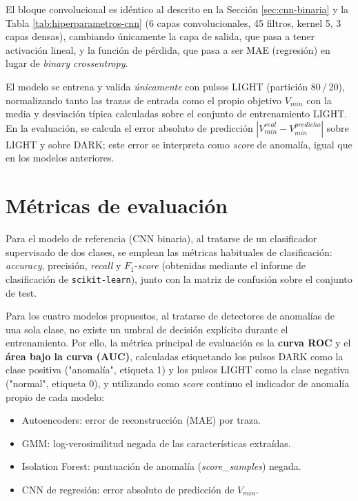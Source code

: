 El bloque convolucional es idéntico al descrito en la Sección \ref{sec:cnn-binaria} y la Tabla \ref{tab:hiperparametros-cnn} (6 capas convolucionales, 45 filtros, kernel 5, 3 capas densas), cambiando únicamente la capa de salida, que pasa a tener activación lineal, y la función de pérdida, que pasa a ser MAE (regresión) en lugar de \textit{binary crossentropy}.

El modelo se entrena y valida \emph{únicamente} con pulsos LIGHT (partición 80\,/\,20), normalizando tanto las trazas de entrada como el propio objetivo $V_{min}$ con la media y desviación típica calculadas sobre el conjunto de entrenamiento LIGHT. En la evaluación, se calcula el error absoluto de predicción $|V_{min}^{real} - V_{min}^{predicho}|$ sobre LIGHT y sobre DARK; este error se interpreta como \textit{score} de anomalía, igual que en los modelos anteriores.


\section{Métricas de evaluación}
\label{sec:metricas-evaluacion}

Para el modelo de referencia (CNN binaria), al tratarse de un clasificador supervisado de dos clases, se emplean las métricas habituales de clasificación: \textit{accuracy}, precisión, \textit{recall} y $F_1$-\textit{score} (obtenidas mediante el informe de clasificación de \texttt{scikit-learn}), junto con la matriz de confusión sobre el conjunto de test.

Para los cuatro modelos propuestos, al tratarse de detectores de anomalías de una sola clase, no existe un umbral de decisión explícito durante el entrenamiento. Por ello, la métrica principal de evaluación es la \textbf{curva ROC} y el \textbf{área bajo la curva (AUC)}, calculadas etiquetando los pulsos DARK como la clase positiva ("anomalía", etiqueta 1) y los pulsos LIGHT como la clase negativa ("normal", etiqueta 0), y utilizando como \textit{score} continuo el indicador de anomalía propio de cada modelo:

\begin{itemize}
	\item Autoencoders: error de reconstrucción (MAE) por traza.
	\item GMM: log-verosimilitud negada de las características extraídas.
	\item Isolation Forest: puntuación de anomalía (\textit{score\_samples}) negada.
	\item CNN de regresión: error absoluto de predicción de $V_{min}$.
\end{itemize}

